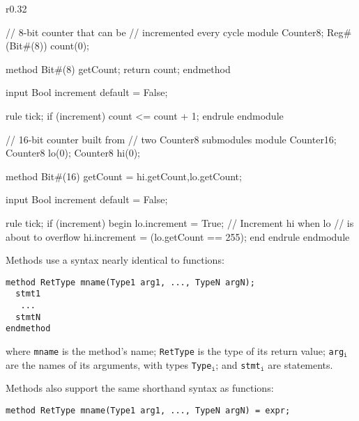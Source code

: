 \begin{wrapfigure}{r}{0.32\columnwidth}
\vspace{-2em}
\begin{mscode}
// 8-bit counter that can be
// incremented every cycle
module Counter8;
  Reg#(Bit#(8)) count(0);

  method Bit#(8) getCount;
    return count;
  endmethod

  input Bool increment
    default = False;

  rule tick;
    if (increment)
      count <= count + 1;
  endrule
endmodule

// 16-bit counter built from 
// two Counter8 submodules
module Counter16;
  Counter8 lo(0);
  Counter8 hi(0);

  method Bit#(16) getCount =
   {hi.getCount,lo.getCount};

  input Bool increment
    default = False;

  rule tick;
    if (increment) begin
      lo.increment = True;
      // Increment hi when lo
      // is about to overflow
      hi.increment =
       (lo.getCount == 255);
    end
  endrule
endmodule

\end{mscode}

\vspace{-9em}
\end{wrapfigure}



Methods use a syntax nearly identical to functions:
\begin{center}
\verb|method RetType mname(Type1 arg1, ..., TypeN argN);| \\
\verb|  stmt1                                           | \\
\verb|   ...                                            | \\
\verb|  stmtN                                           | \\
\verb|endmethod                                         |
\end{center}
where \verb|mname| is the method's name;
\verb|RetType| is the type of its return value;
\verb|arg|$_{\texttt{i}}$ are the names of its arguments,
with types \verb|Type|$_{\texttt{i}}$;
and \verb|stmt|$_{\texttt{i}}$ are statements.

Methods also support the same shorthand syntax as functions:
\begin{center}
\verb|method RetType mname(Type1 arg1, ..., TypeN argN) = expr;|
\end{center}

